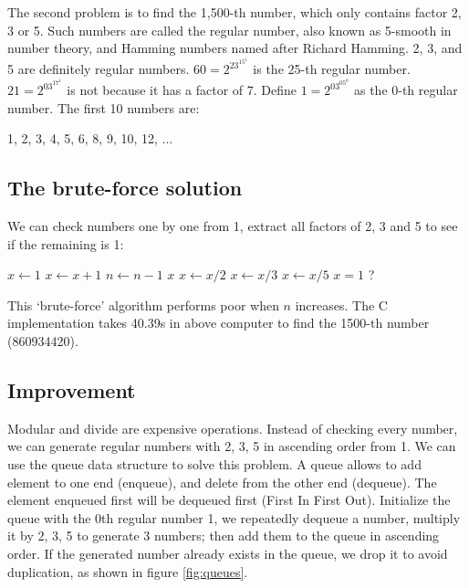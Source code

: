 \documentclass[b5paper]{article}
\begin{document}
The second problem is to find the 1,500-th number, which only contains factor 2, 3 or 5. Such numbers are called the regular number, also known as 5-smooth in number theory, and Hamming numbers named after Richard Hamming. 2, 3, and 5 are definitely regular numbers. $60 = 2^23^15^1$ is the 25-th regular number. $21 = 2^03^17^1$ is not because it has a factor of 7. Define $1=2^03^05^0$ as the 0-th regular number. The first 10 numbers are:

1, 2, 3, 4, 5, 6, 8, 9, 10, 12, ...

\subsection*{The brute-force solution}
We can check numbers one by one from 1, extract all factors of 2, 3 and 5 to see if the remaining is 1:

\begin{algorithmic}[1]
  \State $x \gets 1$
    \State $x \gets x + 1$
      \State $n \gets n - 1$
    \EndIf
  \EndWhile
  \State \Return $x$
\EndFunction
\Statex
{}
    \State $x \gets x / 2$
  \EndWhile
    \State $x \gets x / 3$
  \EndWhile
    \State $x \gets x / 5$
  \EndWhile
  \State \Return $x = 1$ ?
\EndFunction
\end{algorithmic}

This `brute-force' algorithm performs poor when $n$ increases. The C implementation takes 40.39s in above computer to find the 1500-th number (860934420).

\subsection*{Improvement}
Modular and divide are expensive\cite{Bentley} operations. Instead of checking every number, we can generate regular numbers with 2, 3, 5 in ascending order from 1. We can use the queue data structure to solve this problem. A queue allows to add element to one end (enqueue), and delete from the other end (dequeue). The element enqueued first will be dequeued first (First In First Out). Initialize the queue with the 0th regular number 1, we repeatedly dequeue a number, multiply it by 2, 3, 5 to generate 3 numbers; then add them to the queue in ascending order. If the generated number already exists in the queue, we drop it to avoid duplication, as shown in figure \ref{fig:queues}.
\end{document}
